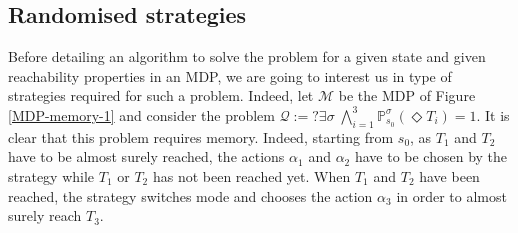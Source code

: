 \subsection{Randomised strategies}
Before detailing an algorithm to solve the \MOSR{} problem for a given state and given reachability properties in an MDP, we are going to interest us in type of strategies required for such a problem.
Indeed, let $\mathcal{M}$ be the MDP of Figure \ref{MDP-memory-1} and consider the \MOSR{} problem $\mathcal{Q}:= ?\exists \sigma \; \bigwedge_{i=1}^3 \mathbb{P}^\sigma_{s_0}(\Diamond T_i) = 1$.
It is clear that this problem requires memory.
Indeed, starting from $s_0$, as $T_1$ and $T_2$ have to be almost surely reached, the actions $\alpha_1$ and $\alpha_2$ have to be chosen by the strategy while $T_1$ or $T_2$ has not been reached yet.
When $T_1$ and $T_2$ have been reached, the strategy switches mode and chooses the action $\alpha_3$ in order to almost surely reach $T_3$.
